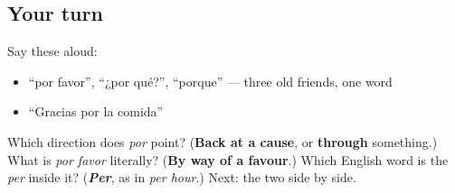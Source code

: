 \subsection*{Your turn}
Say these aloud:

\begin{itemize}
\raggedright
  \item \textquotedblleft{}por favor\textquotedblright{}, \textquotedblleft{}¿por qué?\textquotedblright{}, \textquotedblleft{}porque\textquotedblright{} — three old friends, one word
  \item \textquotedblleft{}Gracias por la comida\textquotedblright{}
\end{itemize}

\begin{tcolorbox}[breakable,colback=teal!4,colframe=teal!35!black,title={Before you move on}]
Which direction does \emph{por} point? (\textbf{Back at a cause}, or \textbf{through} something.) What is \emph{por favor} literally? (\textbf{By way of a favour}.) Which English word is the \emph{per} inside it? (\emph{\textbf{Per}}, as in \emph{per hour}.) Next: the two side by side.
\end{tcolorbox}
